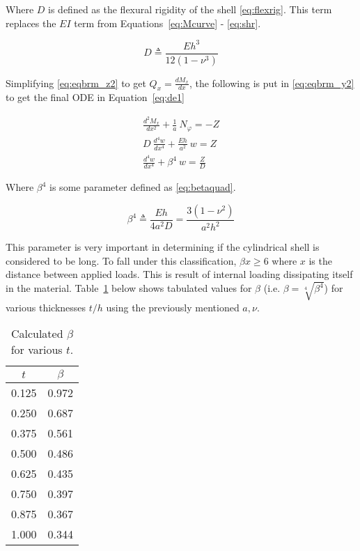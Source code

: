 Where $D$ is defined as the flexural rigidity of the shell \ref{eq:flexrig}. This term replaces the $EI$ term from Equations~\ref{eq:Mcurve} - \ref{eq:shr}.

\begin{equation}
	\label{eq:flexrig}
	D \triangleq \frac{Eh^3}{12(1-\nu^3)}
\end{equation}

Simplifying \ref{eq:eqbrm_z2} to get $Q_x = \frac{dM_x}{dx}$, the following is put in \ref{eq:eqbrm_y2} to get the final ODE in Equation~\ref{eq:de1}

\begin{equation}
	\label{eq:de1}
	\begin{aligned}
		\frac{d^2M_x}{dx^2}+\frac{1}{a} \ N_\varphi = -Z \\
		D\ \frac{d^4w}{dx^4}+\frac{Eh}{a^2} \ w = Z      \\
		\frac{d^4w}{dx^4}+\beta^4 \ w = \frac{Z}{D}      
	\end{aligned}
\end{equation} 

Where $\beta^4$ is some parameter defined as \ref{eq:betaquad}.

\begin{equation}
	\label{eq:betaquad}
	\beta^4 \triangleq \frac{Eh}{4a^2D}= \frac{3(1-\nu^2)}{a^2h^2}
\end{equation}

This parameter is very important in determining if the cylindrical shell is considered to be long. To fall under this classification, $\beta x \geq 6$ where $x$ is the distance between applied loads. This is result of internal loading dissipating itself in the material. Table~\ref{table:3_beta} below shows tabulated values for $\beta$ (i.e. $\beta = \sqrt[4]{\beta^4}$) for various thicknesses $t/h$ using the previously mentioned $a, \nu$.

\begin{table}[H]
  \centering
  \caption{Calculated $\beta$ for various $t$.}
    \begin{tabular}{cc}
    \textbf{$t$} & \textbf{$\beta$}\\
    \hline
    0.125 & 0.972 \\
    0.250 & 0.687 \\
    0.375 & 0.561 \\
    0.500 & 0.486 \\
    0.625 & 0.435 \\
    0.750 & 0.397 \\
    0.875 & 0.367 \\
    1.000 & 0.344 \\
    \end{tabular}%
  \label{table:3_beta}
\end{table}

